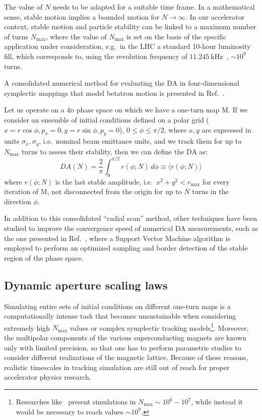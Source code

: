 The value of \(N\) needs to be adapted for a suitable time frame. In a mathematical sense, stable motion implies a bounded motion for \(N\rightarrow\infty\). In our accelerator context, stable motion and particle stability can be linked to a maximum number of turns \(N_{\text{max}}\), where the value of \(N_{\text{max}}\) is set on the basis of the specific application under consideration, e.g.\ in the LHC a standard 10-hour luminosity fill, which corresponds to, using the revolution frequency of \(\SI{11.245}{\kHz}\)~\cite{Benedikt:823808}, \(\sim 10^9\) turns.

A consolidated numerical method for evaluating the DA in four-dimensional symplectic mappings that model betatron motion is presented in Ref.~\cite{PhysRevE.53.4067}.

Let us operate on a 4\textsc{d} phase space on which we have a one-turn map \(\mathrm{M}\). If we consider an ensemble of initial conditions defined on a polar grid (\(x=r\cos\phi, p_x=0, y=r\sin\phi, p_y=0\)), \(0\leq\phi\leq\pi/2\), where \(x,y\) are expressed in units \(\sigma_x, \sigma_y\), i.e.\ nominal beam emittance units, and we track them for up to \(N_{\text{max}}\) turns to assess their stability, then we can define the DA as:
\begin{equation}
	DA(N) = \frac{2}{\pi}\int_0^{\pi/2} r(\phi;N)\,d\phi \equiv \langle r(\phi;N)\rangle
	\label{eq:dynamic_aperture_numerical}
\end{equation}
where \(r(\phi;N)\) is the last stable amplitude, i.e.\ \(x^2 + y^2 < r_{\mathrm{max}}\) for every iteration of \(\mathrm{M}\), not disconnected from the origin for up to \(N\) turns in the direction \(\phi\). %

In addition to this consolidated ``radial scan'' method, other techniques have been studied to improve the convergence speed of numerical DA measurements, such as the one presented in Ref.~\cite{vanderveken:ipac2022-mopost047}, where a Support Vector Machine algorithm is employed to perform an optimized sampling and border detection of the stable region of the phase space.

\subsection{Dynamic aperture scaling laws}

Simulating entire sets of initial conditions on different one-turn maps is a computationally intense task that becomes unsustainable when considering extremely high \(N_{\text{max}}\) values or complex symplectic tracking models\footnote{Researches like~\cite{invlog} present simulations in $N_\text{max}\sim 10^6-10^7$, while instead it would be necessary to reach values \(\sim 10^9\).}. Moreover, the multipolar components of the various superconducting magnets are known only with limited precision, so that one has to perform parametric studies to consider different realizations of the magnetic lattice. Because of these reasons, realistic timescales in tracking simulation are still out of reach for proper accelerator physics research.

